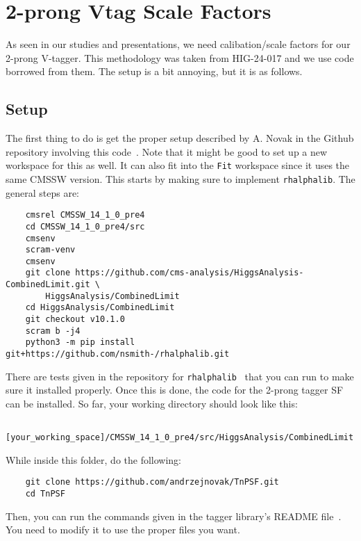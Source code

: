 \section{2-prong Vtag Scale Factors}
As seen in our studies and presentations, we need calibation/scale factors for our 2-prong V-tagger. This methodology was taken from HIG-24-017 and we use code borrowed from them. The setup is a bit annoying, but it is as follows.

\subsection{Setup}
The first thing to do is get the proper setup described by A. Novak in the Github repository involving this code~\cite{2prong}. Note that it might be good to set up a new workspace for this as well. It can also fit into the \verb|Fit| workspace since it uses the same CMSSW version. This starts by making sure to implement \verb|rhalphalib|. The general steps are:

\begin{verbatim}
    cmsrel CMSSW_14_1_0_pre4
    cd CMSSW_14_1_0_pre4/src
    cmsenv
    scram-venv
    cmsenv
    git clone https://github.com/cms-analysis/HiggsAnalysis-CombinedLimit.git \
        HiggsAnalysis/CombinedLimit
    cd HiggsAnalysis/CombinedLimit
    git checkout v10.1.0
    scram b -j4
    python3 -m pip install git+https://github.com/nsmith-/rhalphalib.git
\end{verbatim}

\noindent There are tests given in the repository for \verb|rhalphalib|~\cite{rhalphalib} that you can run to make sure it installed properly. Once this is done, the code for the 2-prong tagger SF can be installed. So far, your working directory should look like this:

\begin{verbatim}
    [your_working_space]/CMSSW_14_1_0_pre4/src/HiggsAnalysis/CombinedLimit
\end{verbatim}

\noindent While inside this folder, do the following:

\begin{verbatim}
    git clone https://github.com/andrzejnovak/TnPSF.git
    cd TnPSF
\end{verbatim}

\noindent Then, you can run the commands given in the tagger library's README file~\cite{2prong}. You need to modify it to use the proper files you want. 

